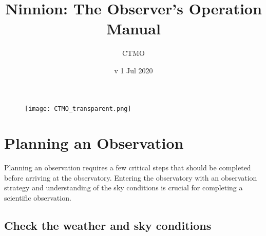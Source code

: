 \documentclass{article}
\title{Ninnion: The Observer's Operation Manual}
\author{CTMO}
\date{v 1 Jul 2020}
\begin{document}
	\maketitle

	\begin{figure}[b]
		\centering
		\texttt{[image: CTMO\_transparent.png]}
	\end{figure}

	\newpage
	\tableofcontents

	\newpage
	\section{Planning an Observation}

		Planning an observation requires a few critical steps that should be completed before arriving at the observatory. Entering the observatory with an observation strategy and understanding of the sky conditions is crucial for completing a scientific observation.

		\subsection{Check the weather and sky conditions}
\end{document}
